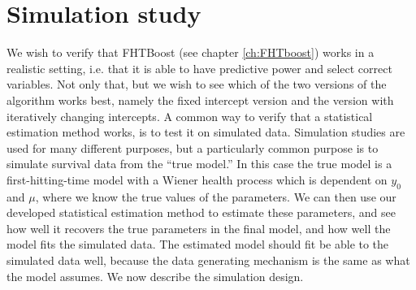\chapter{Simulation study}
We wish to verify that FHTBoost (see chapter \ref{ch:FHTboost}) works in a realistic setting, i.e. that it is able to have predictive power and select correct variables.
Not only that, but we wish to see which of the two versions of the algorithm works best, namely the fixed intercept version and the version with iteratively changing intercepts.
A common way to verify that a statistical estimation method works, is to test it on simulated data.
Simulation studies are used for many different purposes, but a particularly common purpose is to simulate survival data from the ``true model.''
In this case the true model is a first-hitting-time model with a Wiener health process which is dependent on $y_0$ and $\mu$, where we know the true values of the parameters.
We can then use our developed statistical estimation method to estimate these parameters, and see how well it recovers the true parameters in the final model, and how well the model fits the simulated data.
The estimated model should fit be able to the simulated data well, because the data generating mechanism is the same as what the model assumes.
We now describe the simulation design.

